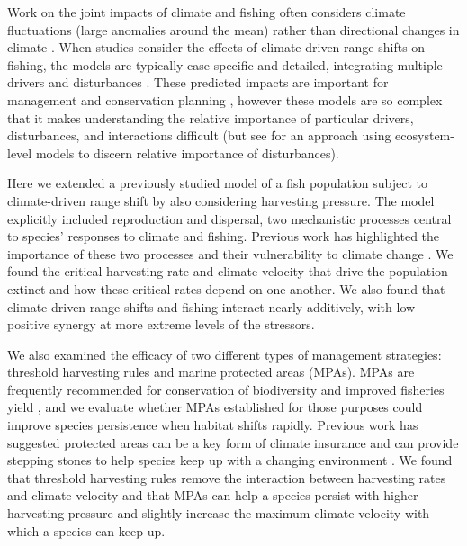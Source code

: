 \documentclass[12pt,english]{article}
\begin{document}
\begin{spacing}{1.9}
\begin{flushleft}
Work on the joint impacts of climate and fishing often considers climate fluctuations (large anomalies around the mean) rather than directional changes in climate \citep{WaltersParma1996, KingMcFarlane2006}. When studies consider the effects of climate-driven range shifts on fishing, the models are typically case-specific and detailed, integrating multiple drivers and disturbances \citep{Cheungetal2010, Lindegrenetal2010, Brownetal2010, Merinoetal2010, Merinoetal2010b, Plaganyietal2011, Ainsworthetal2011, Zhangetal2011, Barangeetal2011, Howardetal2013}. These predicted impacts are important for management and conservation planning \citep{Allisonetal2009}, however these models are so complex that it makes understanding the relative importance of particular drivers, disturbances, and interactions difficult (but see \citet{Nyeetal2013} for an approach using ecosystem-level models to discern relative importance of disturbances).

Here we extended a previously studied model of a fish population subject to climate-driven range shift by also considering harvesting pressure. The model explicitly included reproduction and dispersal, two mechanistic processes central to species' responses to climate and fishing. Previous work has highlighted the importance of these two processes and their vulnerability to climate change \citep{Fordhametal2013, Hastingsetal2005}.  We found the critical harvesting rate and climate velocity that drive the population extinct and how these critical rates depend on one another.   We also found that climate-driven range shifts and fishing interact nearly additively, with low positive synergy at more extreme levels of the stressors.  

We also examined the efficacy of two different types of management strategies: threshold harvesting rules and marine protected areas (MPAs). MPAs are frequently recommended for conservation of biodiversity and improved fisheries yield \citep{Gainesetal2010}, and we evaluate whether MPAs established for those purposes could improve species persistence when habitat shifts rapidly.  Previous work has suggested protected areas can be a key form of climate insurance and can provide stepping stones to help species keep up with a changing environment \citep{Thomasetal2012, Hannahetal2007}.  We found that threshold harvesting rules remove the interaction between harvesting rates and climate velocity and that MPAs can help a species persist with higher harvesting pressure and slightly increase the maximum climate velocity with which a species can keep up.


\end{flushleft}
\end{spacing}
\end{document}
